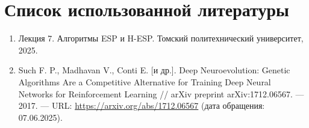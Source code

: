 \documentclass[a4paper,12pt]{article}
\begin{document}
\newpage
\section*{Список использованной литературы}
\begin{enumerate}
    \item Лекция 7. Алгоритмы ESP и H-ESP. Томский политехнический университет, 2025.
    \item Such F. P., Madhavan V., Conti E. [и др.]. Deep Neuroevolution: Genetic Algorithms Are a Competitive Alternative for Training Deep Neural Networks for Reinforcement Learning // arXiv preprint arXiv:1712.06567. — 2017. — URL: \url{https://arxiv.org/abs/1712.06567} (дата обращения: 07.06.2025). 
\end{enumerate}
\end{document}
